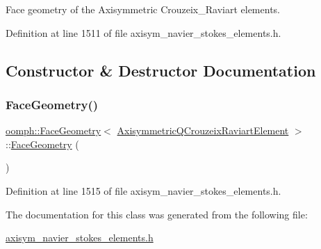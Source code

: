 Face geometry of the Axisymmetric Crouzeix\+\_\+\+Raviart elements. 

Definition at line 1511 of file axisym\+\_\+navier\+\_\+stokes\+\_\+elements.\+h.



\subsection{Constructor \& Destructor Documentation}
\mbox{\label{classoomph_1_1FaceGeometry_3_01AxisymmetricQCrouzeixRaviartElement_01_4_a8be2de7574f28d6c0b5918c587723b3d}} 
\subsubsection{\texorpdfstring{Face\+Geometry()}{FaceGeometry()}}
{\footnotesize\ttfamily \hyperlink{classoomph_1_1FaceGeometry}{oomph\+::\+Face\+Geometry}$<$ \hyperlink{classoomph_1_1AxisymmetricQCrouzeixRaviartElement}{Axisymmetric\+Q\+Crouzeix\+Raviart\+Element} $>$\+::\hyperlink{classoomph_1_1FaceGeometry}{Face\+Geometry} (\begin{DoxyParamCaption}{ }\end{DoxyParamCaption})\hspace{0.3cm}{\ttfamily [inline]}}



Definition at line 1515 of file axisym\+\_\+navier\+\_\+stokes\+\_\+elements.\+h.



The documentation for this class was generated from the following file\+:\begin{DoxyCompactItemize}
\item 
\hyperlink{axisym__navier__stokes__elements_8h}{axisym\+\_\+navier\+\_\+stokes\+\_\+elements.\+h}\end{DoxyCompactItemize}
